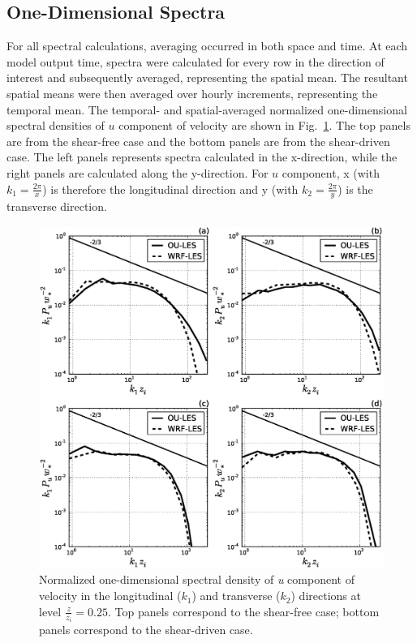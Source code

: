 \subsection{One-Dimensional Spectra}
\label{spec1d-532}

For all spectral calculations, averaging occurred in both space and time. At each model output time, spectra were calculated for every row in the direction of interest and subsequently averaged, representing the spatial mean. The resultant spatial means were then averaged over hourly increments, representing the temporal mean. The temporal- and spatial-averaged normalized one-dimensional spectral densities of $u$ component of velocity are shown in Fig.~\ref{figure504}. The top panels are from the shear-free case and the bottom panels are from the shear-driven case. The left panels represents spectra calculated in the x-direction, while the right panels are calculated along the y-direction. For $u$ component, x (with $k_1 = \frac{2\pi}{x}$) is therefore the longitudinal direction and y (with $k_2 = \frac{2\pi}{y}$) is the transverse direction. 


\begin{figure}[!ht]
\begin{center}
\includegraphics[width=\textwidth]{figures/chapter5/spectra1D_u}
\end{center}
\caption{Normalized one-dimensional spectral density of \textit{u} component of velocity in the longitudinal ($k_1$) and transverse ($k_2$) directions at level $\frac{z}{z_i}=0.25$. Top panels correspond to the shear-free case; bottom panels correspond to the shear-driven case.}
\label{figure504}
\end{figure}


